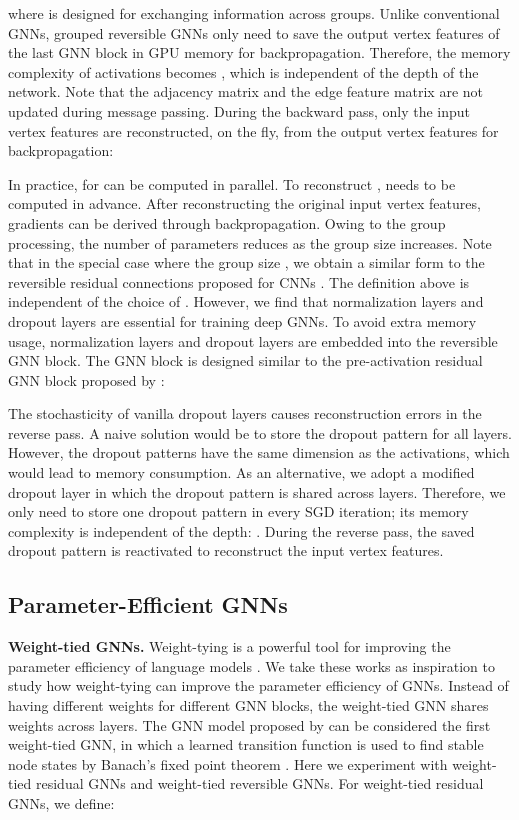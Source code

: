\documentclass{article}
\newcommand{\mysection}[1]{\vspace{0pt}\noindent\textbf{#1.}}
\begin{document}
where  is designed for exchanging information across groups. Unlike conventional GNNs, grouped reversible GNNs only need to save the output vertex features of the last GNN block in GPU memory for backpropagation. Therefore, the memory complexity of activations becomes , which is independent of the depth of the network. Note that the adjacency matrix  and the edge feature matrix  are not updated during message passing. During the backward pass, only the input vertex features are reconstructed, on the fly, from the output vertex features  for backpropagation:

In practice,  for  can be computed in parallel. To reconstruct ,  needs to be computed in advance. After reconstructing the original input vertex features, gradients can be derived through backpropagation. Owing to the group processing, the number of parameters reduces as the group size increases. Note that in the special case where the group size , we obtain a similar form to the reversible residual connections proposed for CNNs \citep{gomez2017reversible}.
The definition above is independent of the choice of . However, we find that normalization layers and dropout layers are essential for training deep GNNs. To avoid extra memory usage, normalization layers and dropout layers are embedded into the reversible GNN block. The GNN block  is designed similar to the pre-activation residual GNN block proposed by \citet{li2020deepergcn}:

The stochasticity of vanilla dropout layers causes reconstruction errors in the reverse pass. A naive solution would be to store the dropout pattern for all layers. However, the dropout patterns have the same dimension as the activations, which would lead to  memory consumption.
As an alternative, we adopt a modified dropout layer in which the dropout pattern is shared across layers. Therefore, we only need to store one dropout pattern in every SGD iteration; its memory complexity is independent of the depth: . During the reverse pass, the saved dropout pattern is reactivated to reconstruct the input vertex features.

\subsection{Parameter-Efficient GNNs}
\mysection{Weight-tied GNNs}
Weight-tying is a powerful tool for improving the parameter efficiency of language models \citep{press2017using,inan2016tying,bai2018trellis}. We take these works as inspiration to study how weight-tying can improve the parameter efficiency of GNNs. Instead of having different weights for different GNN blocks, the weight-tied GNN shares weights across layers. The GNN model proposed by \citet{scarselli2008graph} can be considered the first weight-tied GNN, in which a learned transition function is used to find stable node states by Banach's fixed point theorem \citep{khamsi2001introduction}. Here we experiment with weight-tied residual GNNs and weight-tied reversible GNNs. For weight-tied residual GNNs, we define:
\end{document}
